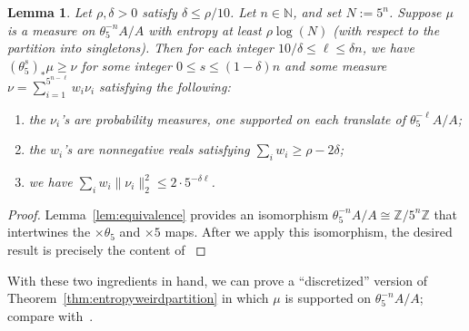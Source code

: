 \documentclass[11pt]{amsart}
\newtheorem{lemma}{Lemma}[section]
\theoremstyle{definition}
\begin{document}
\begin{lemma}\label{lem:partitiontrick}
Let $\rho,\delta>0$ satisfy $\delta \leq \rho/10$.  Let $n \in \mathbb{N}$, and set $N:=5^n$.  Suppose $\mu$ is a measure on $\theta_5^{-n}A/A$ with entropy at least $\rho \log(N)$ (with respect to the partition into singletons).  Then for each integer $10/\delta \leq \ell \leq \delta n$, we have $(\theta_5^s)_*\mu \geq \nu$ for some integer $0 \leq s \leq (1-\delta)n$ and some measure $\nu=\sum_{i=1}^{5^{n-\ell}}w_i \nu_i$ satisfying the following:
\begin{enumerate}
    \item the $\nu_i$'s are probability measures, one supported on each translate of $\theta_5^{-\ell}A/A$;
    \item the $w_i$'s are nonnegative reals satisfying $\sum_i w_i \geq \rho-2\delta$;
    \item we have $\sum_i w_i \|\nu_i\|_2^2 \leq 2\cdot 5^{-\delta \ell}$.
\end{enumerate}
\end{lemma}

\begin{proof}
Lemma~\ref{lem:equivalence} provides an isomorphism $\theta_5^{-n}A/A \cong \mathbb{Z}/5^n \mathbb{Z}$ that intertwines the $\times \theta_5$ and $\times 5$ maps.  After we apply this isomorphism, the desired result is precisely the content of \cite[Lemma 3.6]{BLMV08}
\end{proof}

With these two ingredients in hand, we can prove a ``discretized'' version of Theorem~\ref{thm:entropyweirdpartition} in which $\mu$ is supported on $\theta_5^{-n}A/A$; compare with~\cite[Proposition 3.8]{BLMV08}.
\end{document}
